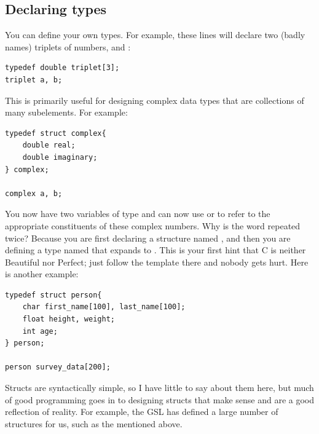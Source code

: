 

\subsection{Declaring types}  
You can define your own
types. For example, these lines will declare two (badly names) triplets
of numbers,  and :

\begin{lstlisting}
typedef double triplet[3];
triplet	a, b;
\end{lstlisting}

This is primarily useful for designing
complex data types that are collections of many subelements. 
For example:

\begin{lstlisting}
typedef struct complex{
    double real;
    double imaginary;
} complex;

complex a, b;
\end{lstlisting}

You now have two variables of type  and can now use  or  to refer to the appropriate constituents
of these complex numbers. Why is the word  repeated
twice? Because you are first declaring a structure named ,
and then you are defining a type named  that expands to
. This is your first hint that C is neither Beautiful
nor Perfect; just follow the template there and nobody gets hurt. Here is
another example:
\begin{lstlisting}
typedef struct person{
    char first_name[100], last_name[100];
    float height, weight;
    int age;
} person;

person survey_data[200];
\end{lstlisting}

Structs are syntactically simple, so I have little to say about them here,
but much of good programming goes in to designing structs that make sense
and are a good reflection of reality.  For example, the GSL has defined
a large number of structures for us, such as the 
mentioned above.



